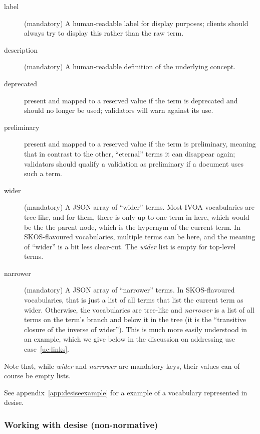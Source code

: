 \documentclass[11pt,a4paper]{ivoa}
\begin{document}
\begin{description}
\item[label] (mandatory) 
A human-readable label for display purposes; clients should
always try to display this rather than the raw term.

\item[description] (mandatory) A human-readable definition of the underlying
concept.

\item[deprecated] present and mapped to a reserved value if the term is
deprecated and should no longer be used; validators will warn against
its use.

\item[preliminary] present and mapped to a reserved value if the term
is preliminary, meaning that in contrast to the other, ``eternal'' terms
it can disappear again; validators should qualify a validation as
preliminary if a document uses such a term.

\item[wider] (mandatory) A JSON array
of ``wider'' terms.  Most IVOA vocabularies are
tree-like, and for them, there is only up to one term in here, which
would be the the parent node, which is the hypernym of the current term.
In SKOS-flavoured vocabularies, multiple terms can be here, and the
meaning of ``wider'' is a bit less clear-cut.  The \textit{wider} list
is empty for top-level terms.

\item[narrower] (mandatory) A JSON array
of ``narrower'' terms.  In SKOS-flavoured
vocabularies, that is just a list of all terms that list the current
term as wider.  Otherwise, the vocabularies are tree-like and
\textit{narrower} is a list of all terms on the term's branch and below
it in the tree (it is the ``transitive closure of the inverse of
wider'').  This is much more easily understood in an example, which we
give below in the discussion on addressing use case~\ref{uc:links}.
\end{description}

Note that, while \textit{wider} and \textit{narrower} are mandatory
keys, their values can of course be empty lists.

See appendix~\ref{app:desiseexample} for a example of a vocabulary
represented in desise.

\subsubsection{Working with desise (non-normative)}
\end{document}
